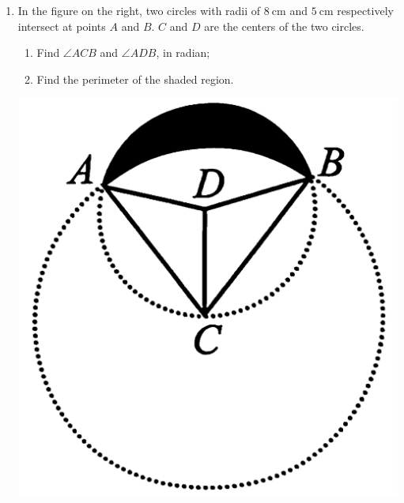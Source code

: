 \documentclass{report}
\begin{document}
\begin{enumerate}
    \item \begin{multicols}{2}
        In the figure on the right, two circles with radii of $8 \mathrm{~cm}$ and $5 \mathrm{~cm}$ respectively intersect at points $A$ and $B$. $C$ and $D$ are the centers of the two circles.
    \begin{enumerate}
    \item Find $\angle ACB$ and $\angle ADB$, in radian;
    \item Find the perimeter of the shaded region.
    \end{enumerate}
    \vfill\null

    \begin{center}
        \includegraphics[scale=0.1]{assets/8-33.png}
    \end{center}
    \end{multicols}


\end{enumerate}
\end{document}
